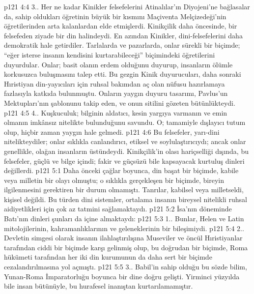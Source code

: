 \vs p121 4:4 3.\bibnobreakspace {}. Her ne kadar Kinikler felsefelerini Atinalılar’ın Diyojeni’ne bağlasalar da, sahip oldukları öğretinin büyük bir kısmını Maçiventa Melçizedeği’nin öğretilerinden arta kalanlardan elde etmişlerdi. Kinikçilik daha öncesinde, bir felsefeden ziyade bir din halindeydi. En azından Kinikler, dini\hyp{}felsefelerini daha demokratik hale getirdiler. Tarlalarda ve pazarlarda, onlar sürekli bir biçimde; “eğer isterse insanın kendisini kurtarabileceği” biçimindeki öğretilerini duyurdular. Onlar; basit olanın erdem olduğunu duyurup, insanların ölümle korkusuzca buluşmasını talep etti. Bu gezgin Kinik duyurucuları, daha sonraki Hıristiyan din\hyp{}yayıcıları için ruhsal bakımdan aç olan nüfusu hazırlamaya fazlasıyla katkıda bulunmuştu. Onların yaygın duyuru tasarımı, Pavlus’un Mektupları’nın şablonunu takip eden, ve onun sitilini gözeten bütünlükteydi.
\vs p121 4:5 4.\bibnobreakspace {}. Kuşkuculuk; bilginin aldatıcı, kesin yargıya varmanın ve emin olmanın imkânsız nitelikte bulunduğunu savundu. O; tamamiyle dışlayıcı tutum olup, hiçbir zaman yaygın hale gelmedi.
\vs p121 4:6 Bu felsefeler, yarı\hyp{}dini nitelikteydiler; onlar sıklıkla canlandırıcı, etiksel ve soylulaştırıcıydı; ancak onlar genellikle, olağan insanların üstündeydi. Kinikçilik’in olası hariçselliği dışında, bu felsefeler, güçlü ve bilge içindi; fakir ve güçsüzü bile kapsayacak kurtuluş dinleri değillerdi.
\vs p121 5:1 Daha önceki çağlar boyunca, din başat bir biçimde, kabile veya milletin bir olayı olmuştu; o sıklıkla gerçekleşen bir biçimde, bireyin ilgilenmesini gerektiren bir durum olmamıştı. Tanrılar, kabilsel veya milletseldi, kişisel değildi. Bu türden dini sistemler, ortalama insanın bireysel nitelikli ruhsal aidiyetlikleri için çok az tatmini sağlamaktaydı.
\vs p121 5:2 İsa’nın döneminde Batı’nın dinleri şunları da içine almaktaydı:
\vs p121 5:3 1.. Bunlar, Helen ve Latin mitolojilerinin, kahramanlıklarının ve geleneklerinin bir bileşimiydi.
\vs p121 5:4 2.\bibnobreakspace {}. Devletin simgesi olarak insanın ilahlaştırılışına Museviler ve öncül Hıristiyanlar tarafından ciddi bir biçimde karşı gelinmiş olup, bu doğrudan bir biçimde, Roma hükümeti tarafından her iki din kurumunun da daha sert bir biçimde cezalandırılmasına yol açmıştı.
\vs p121 5:5 3.\bibnobreakspace {}. Babil’in sahip olduğu bu sözde bilim, Yunan\hyp{}Roma İmparatorluğu boyunca bir dine doğru gelişti. Yirminci yüzyılda bile insan bütünüyle, bu hurafesel inanıştan kurtarılamamıştır.

